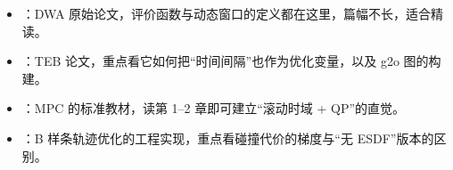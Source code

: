 \begin{reading}

\begin{itemize}
  \item \cite{fox1997dwa}：DWA 原始论文，评价函数与动态窗口的定义都在这里，篇幅不长，适合精读。
  \item \cite{rosmann2012teb}：TEB 论文，重点看它如何把“时间间隔”也作为优化变量，以及 g2o 图的构建。
  \item \cite{rawlings2017mpc}：MPC 的标准教材，读第 1--2 章即可建立“滚动时域 + QP”的直觉。
  \item \cite{zhou2019fastplanner,zhou2021egoplanner}：B 样条轨迹优化的工程实现，重点看碰撞代价的梯度与“无 ESDF”版本的区别。
\end{itemize}


\end{reading}
